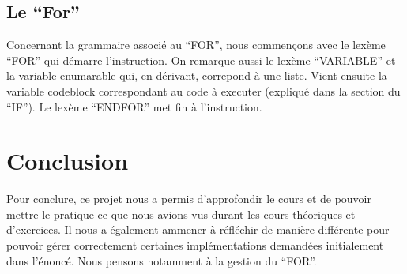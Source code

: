 \documentclass[10pt,a4paper]{article}
\begin{document}
	\subsection{Le ``For''}
	Concernant la grammaire associé au ``FOR'', nous commençons avec le lexème ``FOR'' qui démarre l'instruction.
	On remarque aussi le lexème ``VARIABLE'' et la variable enumarable qui, en dérivant, correpond à une liste.
	Vient ensuite la variable codeblock correspondant au code à executer (expliqué dans la section du ``IF''). Le lexème ``ENDFOR'' 
	met fin à l'instruction.
	\\
	\section{Conclusion}
	Pour conclure, ce projet nous a permis d'approfondir le cours et de pouvoir mettre le pratique ce que nous avions vus durant les cours théoriques 
	et d'exercices. Il nous a également ammener à réfléchir de manière différente pour pouvoir gérer correctement certaines implémentations demandées
	initialement dans l'énoncé. Nous pensons notamment à la gestion du ``FOR''.
	
\end{document}
